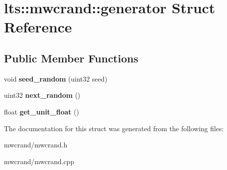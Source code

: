 \hypertarget{structlts_1_1mwcrand_1_1generator}{
\section{lts\-:\-:mwcrand\-:\-:generator \-Struct \-Reference}
\label{structlts_1_1mwcrand_1_1generator}
}
\subsection*{\-Public \-Member \-Functions}
\begin{DoxyCompactItemize}
\item 
\hypertarget{structlts_1_1mwcrand_1_1generator_a93318fe9a6c848ca32c85da536ea57f3}{
void {\bfseries seed\-\_\-random} (uint32 seed)}
\label{structlts_1_1mwcrand_1_1generator_a93318fe9a6c848ca32c85da536ea57f3}

\item 
\hypertarget{structlts_1_1mwcrand_1_1generator_a2418bf248ea16841de65ba5c89a02451}{
uint32 {\bfseries next\-\_\-random} ()}
\label{structlts_1_1mwcrand_1_1generator_a2418bf248ea16841de65ba5c89a02451}

\item 
\hypertarget{structlts_1_1mwcrand_1_1generator_a48774f0b6f6edc1cfb35161e82adf1cd}{
float {\bfseries get\-\_\-unit\-\_\-float} ()}
\label{structlts_1_1mwcrand_1_1generator_a48774f0b6f6edc1cfb35161e82adf1cd}

\end{DoxyCompactItemize}


\-The documentation for this struct was generated from the following files\-:\begin{DoxyCompactItemize}
\item 
mwcrand/mwcrand.\-h\item 
mwcrand/mwcrand.\-cpp\end{DoxyCompactItemize}
